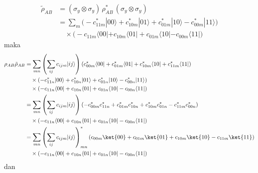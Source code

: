 \begin{equation}
	\begin{aligned}
		\tilde{\rho}_{AB}
		&= (\sigma_y \otimes \sigma_y)\,
		\rho^{*}_{AB}\,
		(\sigma_y \otimes \sigma_y) \\
		&= \sum_m
		\Big(
		- c^{*}_{11m} |00\rangle
		+ c^{*}_{10m} |01\rangle
		+ c^{*}_{01m} |10\rangle
		- c^{*}_{00m} |11\rangle
		\Big) \\
		&\quad \times
		\Big(
		- c_{11m} \langle 00|
		+ c_{10m} \langle 01|
		+ c_{01m} \langle 10|
		- c_{00m} \langle 11|
		\Big)
	\end{aligned}
\end{equation}
maka
\begin{equation}
	\begin{aligned}
		\rho_{AB} \tilde{\rho}_{AB}
		&= \sum_{m n}
		\left(
		\sum_{i j} c_{i j m} | i j \rangle
		\right)
		\left(
		c^{*}_{00m} \langle 00|
		+ c^{*}_{01m} \langle 01|
		+ c^{*}_{10m} \langle 10|
		+ c^{*}_{11m} \langle 11|
		\right) \\
		&\quad \times
		\left(
		- c^{*}_{11n} |00\rangle
		+ c^{*}_{10n} |01\rangle
		+ c^{*}_{01n} |10\rangle
		- c^{*}_{00n} |11\rangle
		\right) \\
		&\quad \times
		\left(
		- c_{11n} \langle 00|
		+ c_{10n} \langle 01|
		+ c_{01n} \langle 10|
		- c_{00n} \langle 11|
		\right)\\
		&= \sum_{m n}
		\left(
		\sum_{i j} c_{i j m} | i j \rangle
		\right)
		\left(
		- c^{*}_{00m} c^{*}_{11n}
		+ c^{*}_{01m} c^{*}_{10n}
		+ c^{*}_{10m} c^{*}_{01n}
		- c^{*}_{11m} c^{*}_{00n}
		\right) \\
		&\quad \times
		\left(
		- c_{11n} \langle 00|
		+ c_{10n} \langle 01|
		+ c_{01n} \langle 10|
		- c_{00n} \langle 11|
		\right)\\
		&= \sum_{m n}
		\left(
		\sum_{i j} c_{i j m} | i j \rangle
		\right)^{*}_{mn}
		\left(
		c_{00m} \ket{00}
		+ c_{01m} \ket{01}
		+ c_{10m} \ket{10}
		- c_{11m} \ket{11}
		\right) \\
		&\quad \times
		\left(
		- c_{11n} \langle 00|
		+ c_{10n} \langle 01|
		+ c_{01n} \langle 10|
		- c_{00n} \langle 11|
		\right)
	\end{aligned}
\end{equation}
dan
